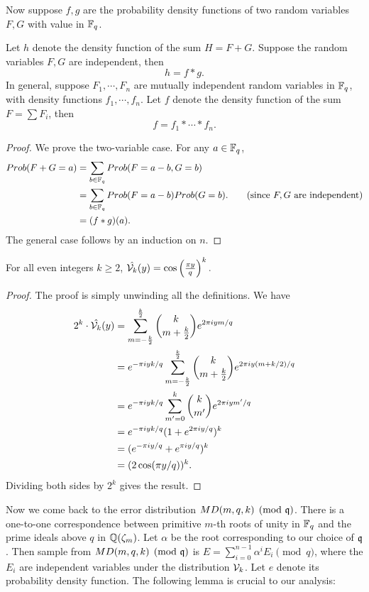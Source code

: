 \documentclass{amsart}
\begin{document}
Now suppose $f,g$ are the probability density functions of two random variables $F,G$ with value in $\mathbb{F}_q$.

\begin{Lemma}
Let $h$ denote the density function of the sum $H =F+G$. Suppose the random variables $F,G$ are independent, then
\[
    h =  f \ast g.
\]
In general, suppose $F_1, \cdots, F_n$ are mutually independent random variables in $\mathbb{F}_q$, with density functions $f_1, \cdots, f_n$. Let $f$ denote the density function of the sum $F = \sum F_i$, then
\[
    f = f_1 \ast \cdots \ast f_n.
\]
\end{Lemma}

\begin{proof}
We prove the two-variable case. For any $a \in \mathbb{F}_q$,
\begin{align*}
Prob(F+G = a) &= \sum_{b \in \mathbb{F}_q} Prob(F = a-b, G =b) \\
& = \sum_{b \in \mathbb{F}_q} Prob(F = a-b)Prob(G =b).  \qquad \mbox{(since $F,G$ are independent)} \\
& = (f \ast g)(a).
\end{align*}
The general case follows by an induction on $n$.
\end{proof}


\begin{Lemma}
\label{lem: transform1}
For all even integers $k \geq 2$, $\hat{\mathcal{V}_k}(y)  = \cos \left(\frac{\pi y}{q}\right)^k.$
\end{Lemma}

\begin{proof} The proof is simply unwinding all the definitions. We have
\begin{align*}
2^k \cdot \hat{\mathcal{V}_k}(y) &= \sum_{m = -\frac{k}{2}}^{\frac{k}{2}} {k \choose m+\frac{k}{2}} e^{2\pi i ym/q}  \\
&= e^{-\pi i yk/q}\sum_{m = -\frac{k}{2}}^{\frac{k}{2}} {k \choose m+\frac{k}{2}} e^{2\pi i y(m+k/2)/q} \\
&= e^{-\pi i yk/q} \sum_{m' = 0}^{k} {k \choose m'} e^{2\pi i ym'/q} \\
& =  e^{-\pi i yk/q} (1+ e^{2 \pi i y/q})^k \\
& = (e^{-\pi i y/q} + e^{\pi i y/q})^k  \\
& = (2 \cos(\pi y/q))^k.
\end{align*}
Dividing both sides by $2^k$ gives the result.
\end{proof}


Now we come back to the error distribution $MD(m,q,k) \pmod {\mathfrak{q}}$. There is a one-to-one correspondence between primitive $m$-th roots of unity in $\mathbb{F}_q$ and the prime ideals above $q$ in $\mathbb{Q}(\zeta_m)$. Let $\alpha$ be the root corresponding to our choice of $\mathfrak{q}$. Then sample from $MD(m,q,k) \pmod {\mathfrak{q}}$ is $E = \sum_{i=0}^{n-1} \alpha^i E_i \pmod {q}$, where the $E_i$ are independent variables under the distribution $\mathcal{V}_k$. Let $e$ denote its probability density function. The following lemma is crucial to our analysis:
\end{document}
